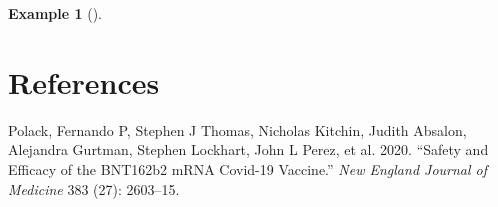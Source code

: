 \documentclass[
  letterpaper,
  DIV=11,
  numbers=noendperiod]{scrreprt}
\newlength{\cslhangindent}
\newenvironment{CSLReferences}[2] %
 {\begin{list}{}{%
  \setlength{\itemindent}{0pt}
  \setlength{\leftmargin}{0pt}
  \setlength{\parsep}{0pt}
  \ifodd #1
   \setlength{\leftmargin}{\cslhangindent}
   \setlength{\itemindent}{-1\cslhangindent}
  \fi
  \setlength{\itemsep}{#2\baselineskip}}}
 {\end{list}}
\theoremstyle{definition}
\theoremstyle{plain}
\theoremstyle{definition}
\newtheorem{example}{Example}[chapter]
\theoremstyle{remark}
\begin{document}
\begin{example}[]

\chapter*{References}\label{references}


\label{refs}
\begin{CSLReferences}{1}{0}
Polack, Fernando P, Stephen J Thomas, Nicholas Kitchin, Judith Absalon,
Alejandra Gurtman, Stephen Lockhart, John L Perez, et al. 2020.
{``Safety and Efficacy of the BNT162b2 mRNA Covid-19 Vaccine.''}
\emph{New England Journal of Medicine} 383 (27): 2603--15.

\end{CSLReferences}

\end{example}
\end{document}
